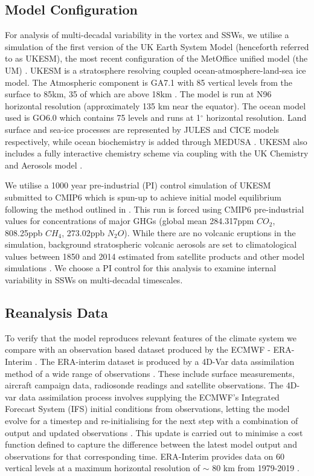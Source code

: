 \subsection{Model Configuration}
\label{sec:model_config}
For analysis of multi-decadal variability in the vortex and SSWs, we utilise a simulation of the first version of the UK Earth System Model (henceforth referred to as UKESM), the most recent configuration of the MetOffice unified model (the UM) \citep{Mulcahy2018}. UKESM is a stratosphere resolving coupled ocean-atmosphere-land-sea ice model. The Atmospheric component is GA7.1 with 85 vertical levels from the surface to 85km, 35 of which are above 18km \citep{Walters2019, Williams2018}. The model is run at N96 horizontal resolution (approximately 135 km near the equator). The ocean model used is GO6.0 \citep{Storkey2018} which contains 75 levels and runs at 1${^\circ}$ horizontal resolution. Land surface and sea-ice processes are represented by JULES \citep[GL7.0,][]{Walters2019} and CICE  \cite[GSI8.1,][]{Ridley2018} models respectively, while ocean biochemistry is added through MEDUSA \citep{Yool2013}. UKESM also includes a fully interactive chemistry scheme via coupling with the UK Chemistry and Aerosols model \citep[UKCA,][]{Mulcahy2018}.

We utilise a 1000 year pre-industrial (PI) control simulation of UKESM submitted to CMIP6 which is spun-up to achieve initial model equilibrium following the method outlined in \cite{Yool20}. This run is forced using CMIP6 pre-industrial values for concentrations of major GHGs (global mean 284.317ppm $CO_2$, 808.25ppb $CH_4$, 273.02ppb $N_2O$). While there are no volcanic eruptions in the simulation, background stratospheric volcanic aerosols are set to climatological values between 1850 and 2014 estimated from satellite products and other model simulations \citep{Menary2018}. We choose a PI control for this analysis to examine internal variability in SSWs on multi-decadal timescales. 


\subsection{Reanalysis Data}
To verify that the model reproduces relevant features of the climate system we compare with an observation based dataset produced by the ECMWF - ERA-Interim \cite{Dee2011}. The ERA-interim dataset is produced by a 4D-Var data assimilation method of a wide range of observations \citep{Uppala2005}. These include surface measurements, aircraft campaign data, radiosonde readings and satellite observations. The 4D-var data assimilation process involves supplying the ECMWF’s Integrated Forecast System (IFS) initial conditions from observations, letting the model evolve for a timestep and re-initialising for the next step with a combination of output and updated observations \citep{Courtier1998, Bouttier2001}. This update is carried out to minimise a cost function defined to capture the difference between the latest model output and observations for that corresponding time. ERA-Interim provides data on 60 vertical levels at a maximum horizontal resolution of $\sim$ 80 km from 1979-2019 \citep{Berrisford}.

